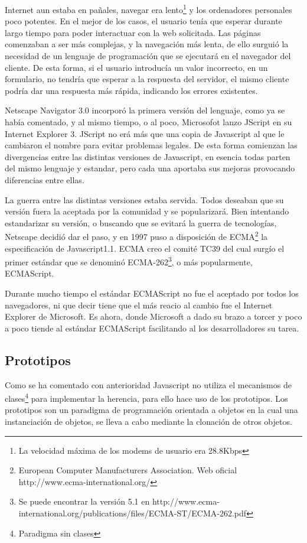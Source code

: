Internet aun estaba en pañales, navegar era lento\footnote{La velocidad máxima de los modems de
  usuario era 28.8Kbps} y los ordenadores personales poco potentes. En el mejor de los casos, el
usuario tenía que esperar durante largo tiempo para poder interactuar con la web solicitada.  Las
páginas comenzaban a ser más complejas, y la navegación más lenta, de ello surguió la necesidad de
un lenguaje de programación que se ejecutará en el navegador del cliente. De esta forma, si el
usuario introducía un valor incorrecto, en un formulario, no tendría que esperar a la respuesta del
servidor, el mismo cliente podría dar una respuesta más rápida, indicando los errores existentes.

Netscape Navigator 3.0 incorporó la primera versión del lenguaje, como ya se había comentado, y al
mismo tiempo, o al poco, Microsofot lanzo JScript en su Internet Explorer 3. JScript no erá más que 
una copia de Javascript al que le cambiaron el nombre para evitar problemas legales. De esta
forma comienzan las divergencias entre las distintas versiones de Javascript, en esencia todas
parten del mismo lenguaje y estandar, pero cada una aportaba sus mejoras provocando diferencias
entre ellas. 

La guerra entre las distintas versiones estaba servida. Todos deseaban que su versión fuera la
aceptada por la comunidad y se popularizará. Bien intentando estandarizar su versión, o buscando
que se evitará la guerra de tecnologías, Netscape decidió dar el paso, y en 1997 puso a disposición
de ECMA\footnote{European Computer Manufacturers Association. Web oficial
  http://www.ecma-international.org/} la especificación de Javascript1.1. ECMA creo el comité TC39
del cual surgío el primer estándar que se denominó ECMA-262\footnote{Se puede encontrar la versión 5.1 en
  http://www.ecma-international.org/publications/files/ECMA-ST/ECMA-262.pdf}, o más popularmente, 
ECMAScript. 

Durante mucho tiempo el estándar ECMAScript no fue el aceptado por todos los navegadores, ni que
decir tiene que el más reacio al cambio fue el Internet Explorer de Microsoft. Es ahora, donde
Microsoft a dado su brazo a torcer y poco a poco tiende al estándar ECMAScript facilitando al los
desarrolladores su tarea.

\subsection{Prototipos}

Como se ha comentado con anterioridad Javascript no utiliza el mecanismos de clases\footnote{Paradigma sin clases} para implementar la herencia, para ello hace uso de los prototipos. Los prototipos son un paradigma de programación orientada a objetos en la cual una instanciación de objetos, se lleva a cabo mediante la clonación de otros objetos. 

